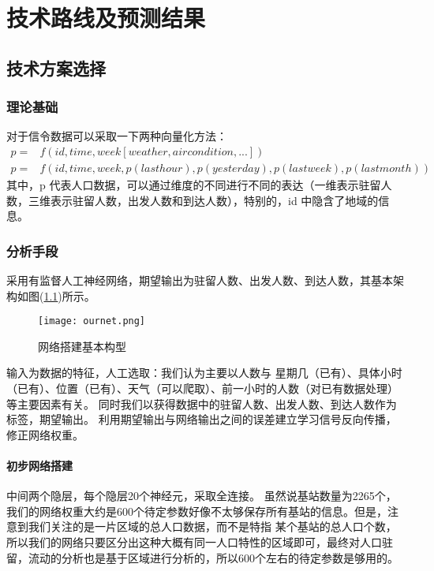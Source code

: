 
\chapter{技术路线及预测结果} 
\label{Chapter3}  
\section{技术方案选择}
\subsection{理论基础}
对于信令数据可以采取一下两种向量化方法：
\begin{equation}
\begin{split}
p = & f(id,time,week[weather,air condition,...])\\
p = & f(id,time,week,p(last hour),p(yesterday),p(last week),p(last month))
\end{split}
\end{equation}
其中，p 代表人口数据，可以通过维度的不同进行不同的表达（一维表示驻留人数，三维表示驻留人数，出发人数和到达人数），特别的，id 中隐含了地域的信息。
\subsection{分析手段}
采用有监督人工神经网络，期望输出为驻留人数、出发人数、到达人数，其基本架构如图(\ref{fig:3.1})所示。
\begin{figure}[ht]
\centering
\texttt{[image: ournet.png]}
\caption{网络搭建基本构型}
\label{fig:3.1}
\end{figure}
输入为数据的特征，人工选取：我们认为主要以人数与 星期几（已有）、具体小时（已有）、位置（已有）、天气（可以爬取）、前一小时的人数（对已有数据处理）等主要因素有关。
同时我们以获得数据中的驻留人数、出发人数、到达人数作为标签，期望输出。
利用期望输出与网络输出之间的误差建立学习信号反向传播，修正网络权重。
\subsubsection*{初步网络搭建}
中间两个隐层，每个隐层20个神经元，采取全连接。
虽然说基站数量为2265个，我们的网络权重大约是600个待定参数好像不太够保存所有基站的信息。但是，注意到我们关注的是一片区域的总人口数据，而不是特指
某个基站的总人口个数，所以我们的网络只要区分出这种大概有同一人口特性的区域即可，最终对人口驻留，流动的分析也是基于区域进行分析的，所以600个左右的待定参数是够用的。
